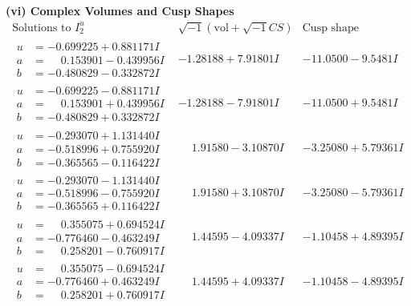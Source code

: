 \documentclass[1p]{elsarticle_modified}
\theoremstyle{definition}
\newcommand{\I}{\sqrt{-1}}
\begin{document}
\newpage\flushleft \textbf{(vi) Complex Volumes and Cusp Shapes}
$$\begin{array}{c|c|c}  
\text{Solutions to }I^u_{2}& \I (\text{vol} + \sqrt{-1}CS) & \text{Cusp shape}\\
 \hline 
\begin{aligned}
u &= -0.699225 + 0.881171 I \\
a &= \phantom{-}0.153901 - 0.439956 I \\
b &= -0.480829 - 0.332872 I\end{aligned}
 & -1.28188 + 7.91801 I & -11.0500 - 9.5481 I \\ \hline\begin{aligned}
u &= -0.699225 - 0.881171 I \\
a &= \phantom{-}0.153901 + 0.439956 I \\
b &= -0.480829 + 0.332872 I\end{aligned}
 & -1.28188 - 7.91801 I & -11.0500 + 9.5481 I \\ \hline\begin{aligned}
u &= -0.293070 + 1.131440 I \\
a &= -0.518996 + 0.755920 I \\
b &= -0.365565 - 0.116422 I\end{aligned}
 & \phantom{-}1.91580 - 3.10870 I & -3.25080 + 5.79361 I \\ \hline\begin{aligned}
u &= -0.293070 - 1.131440 I \\
a &= -0.518996 - 0.755920 I \\
b &= -0.365565 + 0.116422 I\end{aligned}
 & \phantom{-}1.91580 + 3.10870 I & -3.25080 - 5.79361 I \\ \hline\begin{aligned}
u &= \phantom{-}0.355075 + 0.694524 I \\
a &= -0.776460 - 0.463249 I \\
b &= \phantom{-}0.258201 - 0.760917 I\end{aligned}
 & \phantom{-}1.44595 - 4.09337 I & -1.10458 + 4.89395 I \\ \hline\begin{aligned}
u &= \phantom{-}0.355075 - 0.694524 I \\
a &= -0.776460 + 0.463249 I \\
b &= \phantom{-}0.258201 + 0.760917 I\end{aligned}
 & \phantom{-}1.44595 + 4.09337 I & -1.10458 - 4.89395 I \\ \hline\begin{aligned}

\end{aligned}
\end{array}$$
\end{document}
